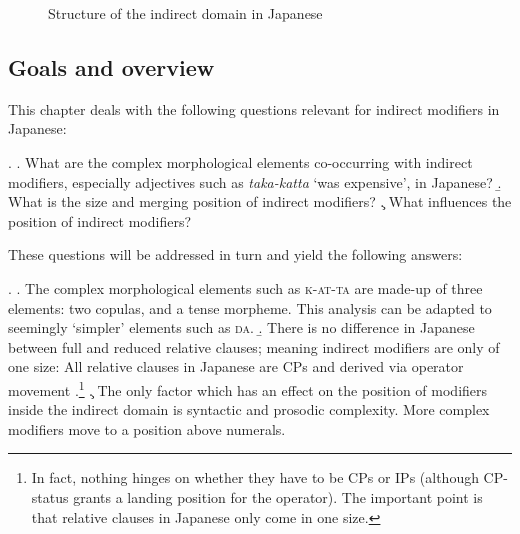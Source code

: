\documentclass [output=book,colorlinks,citecolor=brown]{langscibook}
\begin{document}
\newpage

\begin{figure}[H]
\centering


 \caption{Structure of the indirect domain in Japanese}
 \label{fig:Structure of the indirect domain in Japanese2}
\end{figure}


\subsection{Goals and overview}

This chapter deals with the following questions relevant for indirect modifiers in Japanese:

\ex. \a. What are the complex morphological elements co-occurring with indirect modifiers, especially adjectives such as \textit{taka-katta} `was expensive', in Japanese?
\b. What is the size and merging position of indirect modifiers?
\c. What influences the position of indirect modifiers?

These questions will be addressed in turn and yield the following answers:

\ex. \a. The complex morphological elements such as \textsc{k-at-ta} are made-up of three elements: two copulas, and a tense morpheme. This analysis can be adapted to seemingly `simpler’ elements such as \textsc{da}.
\b. There is no difference in Japanese between full and reduced relative clauses; meaning indirect modifiers are only of one size: All relative clauses in Japanese are CPs and derived via operator movement \citep{miyamoto:2017:RC}.\footnote{In fact, nothing hinges on whether they have to be CPs or IPs (although CP-status grants a landing position for the operator). The important point is that relative clauses in Japanese only come in one size.}
\c. The only factor which has an effect on the position of modifiers inside the indirect domain is syntactic and prosodic complexity. More complex modifiers move to a position above numerals.
\end{document}
